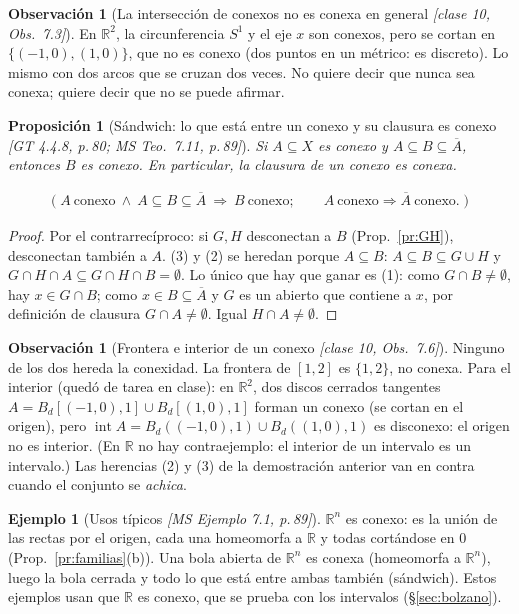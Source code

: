 \documentclass[11pt,a4paper]{article}
\newcommand{\lgc}[1]{\par\vspace{-3pt}\begin{gather*}\big(\;#1\;\big)\end{gather*}\vspace{-6pt}}
\theoremstyle{definition}
\newtheorem{ejemplo}[definicion]{Ejemplo}
\newtheorem{observacion}[definicion]{Observación}
\theoremstyle{plain}
\newtheorem{proposicion}[definicion]{Proposición}
\newcommand{\fnt}[1]{{\normalfont\small\itshape\color{gray!150!black}[#1]}}
\newcommand{\R}{\mathbb{R}}
\newcommand{\cl}[1]{\overline{#1}}
\newcommand{\intr}{\operatorname{int}}
\newcommand{\Bola}[2]{B_d(#1,#2)}
\newcommand{\Bolac}[2]{B_d[#1,#2]}
\begin{document}
\begin{observacion}[La intersección de conexos no es conexa en general \fnt{clase 10, Obs.\ 7.3}]
En $\R^2$, la circunferencia $S^1$ y el eje $x$ son conexos, pero se cortan en $\{(-1,0),(1,0)\}$, que no es conexo (dos puntos en un métrico: es discreto). Lo mismo con dos arcos que se cruzan dos veces. No quiere decir que nunca sea conexa; quiere decir que no se puede afirmar.
\end{observacion}

\begin{proposicion}[Sándwich: lo que está entre un conexo y su clausura es conexo \fnt{GT 4.4.8, p.\,80; MS Teo.\ 7.11, p.\,89}]\label{pr:sandwich}
Si $A\subseteq X$ es conexo y $A\subseteq B\subseteq\cl A$, entonces $B$ es conexo. En particular, la clausura de un conexo es conexa.
\lgc{A\ \text{conexo}\ \wedge\ A\subseteq B\subseteq\cl A\ \Rightarrow\ B\ \text{conexo};\qquad A\ \text{conexo}\Rightarrow\cl A\ \text{conexo}.}
\end{proposicion}

\begin{proof}
Por el contrarrecíproco: si $G,H$ desconectan a $B$ (Prop.~\ref{pr:GH}), desconectan también a $A$. (3) y (2) se heredan porque $A\subseteq B$: $A\subseteq B\subseteq G\cup H$ y $G\cap H\cap A\subseteq G\cap H\cap B=\emptyset$. Lo único que hay que ganar es (1): como $G\cap B\ne\emptyset$, hay $x\in G\cap B$; como $x\in B\subseteq\cl A$ y $G$ es un abierto que contiene a $x$, por definición de clausura $G\cap A\ne\emptyset$. Igual $H\cap A\ne\emptyset$.
\end{proof}

\begin{observacion}[Frontera e interior de un conexo \fnt{clase 10, Obs.\ 7.6}]
Ninguno de los dos hereda la conexidad. La frontera de $[1,2]$ es $\{1,2\}$, no conexa. Para el interior (quedó de tarea en clase): en $\R^2$, dos discos cerrados tangentes $A=\Bolac{(-1,0)}{1}\cup\Bolac{(1,0)}{1}$ forman un conexo (se cortan en el origen), pero $\intr A=\Bola{(-1,0)}{1}\cup\Bola{(1,0)}{1}$ es disconexo: el origen no es interior. (En $\R$ no hay contraejemplo: el interior de un intervalo es un intervalo.) Las herencias (2) y (3) de la demostración anterior van en contra cuando el conjunto se \emph{achica}.
\end{observacion}

\begin{ejemplo}[Usos típicos \fnt{MS Ejemplo 7.1, p.\,89}]
$\R^n$ es conexo: es la unión de las rectas por el origen, cada una homeomorfa a $\R$ y todas cortándose en $0$ (Prop.~\ref{pr:familias}(b)). Una bola abierta de $\R^n$ es conexa (homeomorfa a $\R^n$), luego la bola cerrada y todo lo que está entre ambas también (sándwich). Estos ejemplos usan que $\R$ es conexo, que se prueba con los intervalos (\S\ref{sec:bolzano}).
\end{ejemplo}
\end{document}
